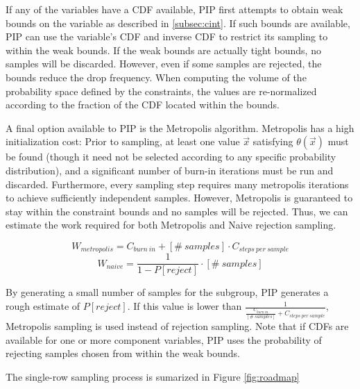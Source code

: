 If any of the variables have a CDF available, PIP first attempts to obtain weak bounds on the variable as described in \ref{subsec:cint}.  If such bounds are available, PIP can use the variable's CDF and inverse CDF to restrict its sampling to within the weak bounds.  If the weak bounds are actually tight bounds, no samples will be discarded.  However, even if some samples are rejected, the bounds reduce the drop frequency.  When computing the volume of the probability space defined by the constraints, the values are re-normalized according to the fraction of the CDF located within the bounds.

A final option available to PIP is the Metropolis algorithm.  Metropolis has a high initialization cost: Prior to sampling, at least one value $\vec x$ satisfying $\theta(\vec x)$ must be found (though it need not be selected according to any specific probability distribution), and a significant number of burn-in iterations must be run and discarded.  Furthermore, every sampling step requires many metropolis iterations to achieve sufficiently independent samples.  However, Metropolis is guaranteed to stay within the constraint bounds and no samples will be rejected.  Thus, we can estimate the work required for both Metropolis and Naive rejection sampling.

$$W_{metropolis} = C_{burn\ in} + [\#\ samples] \cdot C_{steps\ per\ sample}$$
$$W_{naive} = \frac{1}{1-P[reject]} \cdot [\#\ samples]$$

By generating a small number of samples for the subgroup, PIP generates a rough estimate of $P[reject]$.  If this value is lower than $\frac{1}{\frac{C_{burn\ in}}{[\#\ samples]} + C_{steps\ per\ sample}}$, Metropolis sampling is used instead of rejection sampling.  Note that if CDFs are available for one or more component variables, PIP uses the probability of rejecting samples chosen from within the weak bounds.

The single-row sampling process is sumarized in Figure \ref{fig:roadmap}

